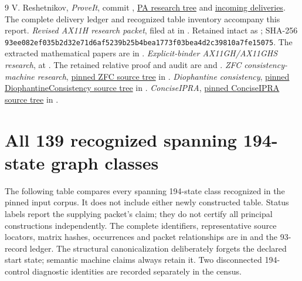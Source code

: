 \documentclass[11pt]{article}
\begin{document}
\begin{thebibliography}{9}
V. Reshetnikov, \emph{ProveIt}, commit
,
\href{https://github.com/VladimirReshetnikov/ProveIt/tree/8d31445d858761a8f6150c2e5012adae8895e932/Computability/BusyBeaver/Research/PA}{PA research tree}
and
\href{https://github.com/VladimirReshetnikov/ProveIt/tree/8d31445d858761a8f6150c2e5012adae8895e932/docs/incoming}{incoming deliveries}.
The complete delivery ledger and recognized table inventory accompany this report.
\emph{Revised AX11H research packet}, filed at
 in \cite{pinned}.
Retained intact as ;
SHA-256 \nolinkurl{93ee082ef035b2d32e71d6af5239b25b4bea1773f03bea4d2c39810a7fe15075}.
The extracted mathematical papers are in .
\emph{Explicit-binder AX11GH/AX11GHS research},
 at \cite{pinned}.
The retained relative proof and audit are
 and
.
\emph{ZFC consistency-machine research},
\href{https://github.com/VladimirReshetnikov/ProveIt/tree/8d31445d858761a8f6150c2e5012adae8895e932/Computability/BusyBeaver/Research/ZFC}{pinned ZFC source tree} in \cite{pinned}.
\emph{Diophantine consistency},
\href{https://github.com/VladimirReshetnikov/ProveIt/tree/8d31445d858761a8f6150c2e5012adae8895e932/Computability/DiophantineConsistency}{pinned DiophantineConsistency source tree} in \cite{pinned}.
\emph{ConciseIPRA},
\href{https://github.com/VladimirReshetnikov/ProveIt/tree/8d31445d858761a8f6150c2e5012adae8895e932/Logic/PrimitiveRecursiveArithmetic/ConciseIPRA}{pinned ConciseIPRA source tree} in \cite{pinned}.
\end{thebibliography}

\clearpage\appendix
\section{All 139 recognized spanning 194-state graph classes}
\label{app:classes}
The following table compares every spanning 194-state class recognized
in the pinned input corpus.  It does not include either newly constructed table.
Status labels report the supplying packet's claim; they do not certify
all principal constructions independently.  The complete identifiers,
representative source locators, matrix hashes, occurrences and packet
relationships are in  and the 93-record ledger.
The structural canonicalization deliberately forgets the declared start
state; semantic machine claims always retain it.  Two disconnected
194-control diagnostic identities are recorded separately in the census.
\begingroup\footnotesize\raggedright

\endgroup
\end{document}
